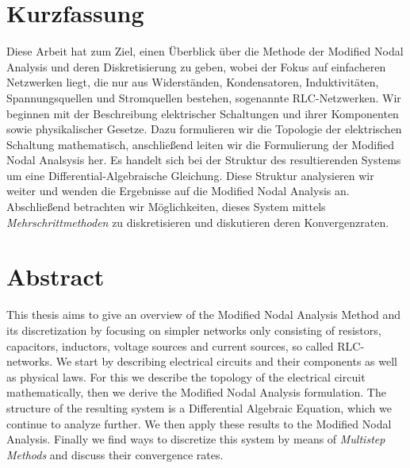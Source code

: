 
{%
	\chapter*{Kurzfassung}
	
		Diese Arbeit hat zum Ziel, einen Überblick über die Methode der Modified Nodal Analysis und deren Diskretisierung zu geben, wobei der Fokus auf einfacheren Netzwerken liegt, die nur aus Widerständen, Kondensatoren, Induktivitäten, Spannungsquellen und Stromquellen bestehen, sogenannte RLC-Netzwerken. Wir beginnen mit der Beschreibung elektrischer Schaltungen und ihrer Komponenten sowie physikalischer Gesetze. Dazu formulieren wir die Topologie der elektrischen Schaltung mathematisch, anschließend leiten wir die Formulierung der Modified Nodal Analsysis her. Es handelt sich bei der Struktur des resultierenden Systems um eine Differential-Algebraische Gleichung. Diese Struktur analysieren wir weiter und wenden die Ergebnisse auf die Modified Nodal Analysis an. Abschließend betrachten wir Möglichkeiten, dieses System mittels \emph{Mehrschrittmethoden} zu diskretisieren und diskutieren deren Konvergenzraten.
}

{%
	\chapter*{Abstract}
	
		This thesis aims to give an overview of the Modified Nodal Analysis Method and its discretization by focusing on simpler networks only consisting of resistors, capacitors, inductors, voltage sources and current sources, so called RLC-networks. We start by describing electrical circuits and their components as well as physical laws. For this we describe the topology of the electrical circuit mathematically, then we derive the Modified Nodal Analysis formulation. The structure of the resulting system is a Differential Algebraic Equation, which we continue to analyze further. We then apply these results to the Modified Nodal Analysis. Finally we find ways to discretize this system by means of \emph{Multistep Methods} and discuss their convergence rates.
}